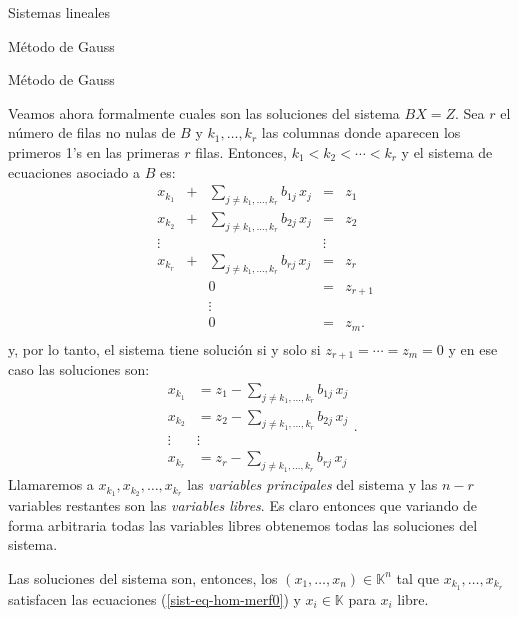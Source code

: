 \documentclass[a4paper,12pt,twoside,spanish,reqno]{amsbook}
\numberwithin{equation}{section}
\theoremstyle{definition}
\theoremstyle{remark}
\newcommand{\K}{\mathbb K}
\begin{document}
\begin{chapter}{Sistemas lineales}
\begin{section}{Método de Gauss }
\begin{subsection}{Método de Gauss}
                
                 Veamos ahora formalmente cuales son las soluciones del sistema $BX=Z$. Sea $r$ el número de filas no nulas de $B$ y $k_1,\ldots, k_r$ las columnas donde aparecen los primeros 1's en las primeras $r$ filas. Entonces, $k_1 < k_2 < \cdots< k_r$ y el sistema de ecuaciones asociado a $B$ es:
                \begin{equation}
                \begin{matrix}
                &x_{k_1}& + &\sum_{j \not= k_1,\ldots, k_r} b_{1j}\,x_j&= &z_1\\
                &x_{k_2}& + &\sum_{j \not= k_1,\ldots, k_r} b_{2j}\,x_j&= &z_2\\
                & \vdots& &  &\vdots \\
                &x_{k_r}& + &\sum_{j \not= k_1,\ldots, k_r} b_{rj}\,x_j&= &z_r\\
                &&  &0&= &z_{r+1}\\
                &&  &\vdots &\\
                &&  &0&= &z_{m}.\\
                \end{matrix}
                \end{equation}  
                y, por lo tanto, el sistema tiene solución si y solo si  $z_{r+1} = \cdots = z_m =0$ y en ese caso las soluciones son: 
                \begin{equation}
                \begin{matrix}\label{sist-eq-hom-merf0}
                x_{k_1} &= z_1-\sum_{j \not= k_1,\ldots, k_r} b_{1j}\,x_j\\
                x_{k_2} &= z_2-\sum_{j \not= k_1,\ldots, k_r} b_{2j}\,x_j\\
                \vdots& \vdots \\
                x_{k_r}  &= z_r-\textstyle\sum_{j \not= k_1,\ldots, k_r} b_{rj}\,x_j
                \end{matrix}.
                \end{equation} 
                Llamaremos a  $x_{k_1}, x_{k_2}, \ldots, x_{k_r}$ las \textit{variables principales} del sistema  y  las $n-r$ variables restantes son las \textit{variables libres}. Es claro entonces que variando de forma arbitraria todas las variables libres obtenemos todas las soluciones del sistema.
                
                 Las soluciones del sistema son, entonces,  los $(x_1,\ldots,x_n)\in \K^n$ tal que $x_{k_1},\ldots,x_{k_r}$ satisfacen las ecuaciones (\ref{sist-eq-hom-merf0}) y $x_i \in \K$ para $x_i$ libre. 
                

\end{subsection}
\end{section}
\end{chapter}
\end{document}
